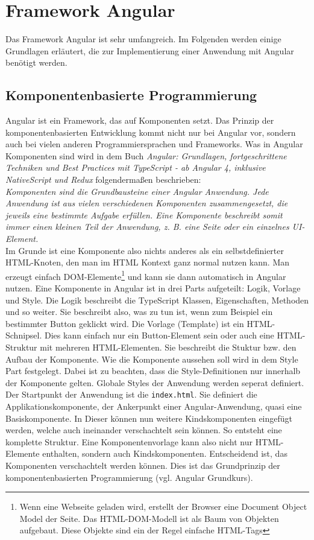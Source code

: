 \section{Framework Angular}
\label{sec:angular7}
Das Framework Angular ist sehr umfangreich. Im Folgenden werden einige Grundlagen erläutert, die zur Implementierung einer Anwendung mit Angular benötigt werden.
\subsection{Komponentenbasierte Programmierung}
%
Angular ist ein Framework, das auf Komponenten setzt. Das Prinzip der komponentenbasierten Entwicklung kommt nicht nur bei Angular vor, sondern auch bei vielen anderen Programmiersprachen und Frameworks. Was in Angular Komponenten sind wird in dem Buch \textit{Angular: Grundlagen, fortgeschrittene Techniken und Best Practices mit TypeScript - ab Angular 4, inklusive NativeScript und Redux} folgendermaßen beschrieben:\\
%

\textit{\glqq Komponenten sind die Grundbausteine einer Angular Anwendung. Jede Anwendung ist aus vielen verschiedenen Komponenten zusammengesetzt, die jeweils eine bestimmte Aufgabe erfüllen. Eine Komponente beschreibt somit immer einen kleinen Teil der Anwendung, z. B. eine Seite oder ein einzelnes UI-Element.\grqq }\cite{woiwode_angular:_2017} \\

%
Im Grunde ist eine Komponente also nichts anderes als ein selbstdefinierter HTML-Knoten, den man im HTML Kontext ganz normal nutzen kann. Man erzeugt einfach DOM-Elemente\footnote{Wenn eine Webseite geladen wird, erstellt der Browser eine Document Object Model der Seite. Das HTML-DOM-Modell ist als Baum von Objekten aufgebaut. Diese Objekte sind ein der Regel einfache HTML-Tags} und kann sie dann automatisch in Angular nutzen.
Eine Komponente in Angular ist in drei Parts aufgeteilt: Logik, Vorlage und Style. Die Logik beschreibt die TypeScript Klassen, Eigenschaften, Methoden und so weiter. Sie beschreibt also, was zu tun ist, wenn zum Beispiel ein bestimmter Button geklickt wird. Die Vorlage (Template) ist ein HTML-Schnipsel. Dies kann einfach nur ein Button-Element sein oder auch eine HTML-Struktur mit mehreren HTML-Elementen. Sie beschreibt die Stuktur bzw. den Aufbau der Komponente. Wie die Komponente aussehen soll wird in dem Style Part festgelegt. Dabei ist zu beachten, dass die Style-Definitionen nur innerhalb der Komponente gelten. Globale Styles der Anwendung werden seperat definiert.\\
Der Startpunkt der Anwendung ist die \texttt{index.html}. Sie definiert die Applikationskomponente, der Ankerpunkt einer Angular-Anwendung, quasi eine Basiskomponente. In Dieser können nun weitere Kindskomponenten eingefügt werden, welche auch ineinander verschachtelt sein können. So entsteht eine komplette Struktur. Eine Komponentenvorlage kann also nicht nur HTML-Elemente enthalten, sondern auch Kindskomponenten. Entscheidend ist, das Komponenten verschachtelt werden können. Dies ist das Grundprinzip der komponentenbasierten Programmierung (vgl. Angular Grundkurs\cite{unlu_angular_2018}).

